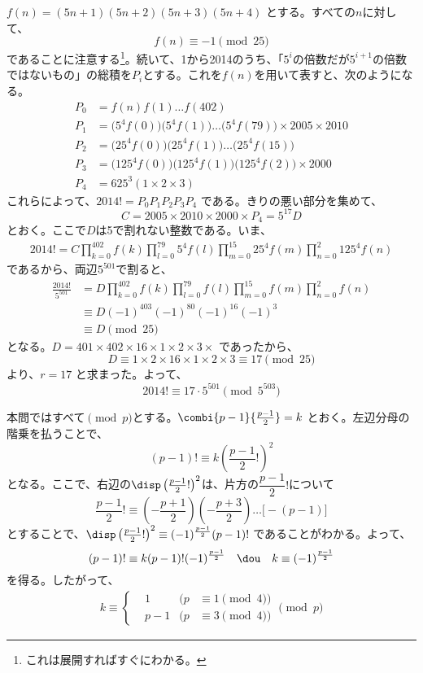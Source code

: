 $f(n)=(5n+1)(5n+2)(5n+3)(5n+4)$ とする。すべての$n$に対して、
\[ f(n)\equiv -1 \pmod{25} \]
であることに注意する\footnote{これは展開すればすぐにわかる。}。続いて、1から2014のうち、「$5^i$の倍数だが$5^{i+1}$の倍数ではないもの」の総積を$P_i$とする。これを$f(n)$を用いて表すと、次のようになる。
\begin{align*}
 P_0&=f(n)f(1)\dots f(402) \\
 P_1&=\bigl(5^4f(0)\bigr)\bigl(5^4f(1)\bigr)\dots\bigl(5^4f(79)\bigr)\times 2005\times 2010 \\
 P_2&=\bigl(25^4f(0)\bigr)\bigl(25^4f(1)\bigr)\dots\bigl(25^4f(15)\bigr) \\
 P_3&=\bigl(125^4f(0)\bigr)\bigl(125^4f(1)\bigr)\bigl(125^4f(2)\bigr)\times 2000 \\
 P_4&=625^3(1\times 2\times 3)
\end{align*}
これらによって、$2014!=P_0P_1P_2P_3P_4$ である。きりの悪い部分を集めて、
\[ C=2005\times 2010\times 2000\times P_4=5^{17}D \]
とおく。ここで$D$は5で割れない整数である。いま、
\begin{align*}
 2014!=C\prod_{k=0}^{402}f(k)\prod_{l=0}^{79}5^4f(l)\prod_{m=0}^{15}25^4f(m)\prod_{n=0}^{2}125^4f(n)
\end{align*}
であるから、両辺$5^{501}$で割ると、
\begin{align*}
 \frac{2014!}{5^{501}}&=D\prod_{k=0}^{402}f(k)\prod_{l=0}^{79}f(l)\prod_{m=0}^{15}f(m)\prod_{n=0}^{2}f(n) \\
 &\equiv D(-1)^{403}(-1)^{80}(-1)^{16}(-1)^{3} \\
 &\equiv D \pmod{25}
\end{align*}
となる。$D=401\times 402\times 16\times 1\times 2\times 3\times$ であったから、
\[ D\equiv 1\times 2\times 16\times 1\times 2\times 3\equiv 17 \pmod{25} \]
より、$r=17$ と求まった。よって、
\[ 2014!\equiv 17\cdot 5^{501} \pmod{5^{503}} \]

本問ではすべて$\pmod{p}$とする。$\combi{p-1}{\frac{p-1}{2}}=k$ とおく。左辺分母の階乗を払うことで、
\[ (p-1)!\equiv k\left(\frac{p-1}{2}!\right)^2 \]
となる。ここで、右辺の$\disp \left(\frac{p-1}{2}!\right)^2$は、片方の$\dfrac{p-1}{2}!$について
\[ \frac{p-1}{2}!\equiv \left(-\frac{p+1}{2}\right)\left(-\frac{p+3}{2}\right)\dots\bigl[-(p-1)\bigr] \]
とすることで、$\disp\left(\frac{p-1}{2}!\right)^2\equiv (-1)^{\frac{p-1}{2}}(p-1)!$ であることがわかる。よって、
\[ (p-1)!\equiv k(p-1)!(-1)^{\frac{p-1}{2}} \quad\dou\quad k\equiv (-1)^{\frac{p-1}{2}} \]
を得る。したがって、
\begin{align*}
 k\equiv \left\{
 \begin{aligned}
  &1 & (p&\equiv 1 \pmod{4}) \\
  &p-1 & (p&\equiv 3 \pmod{4})
 \end{aligned} 
 \right. \pmod{p}
\end{align*}

